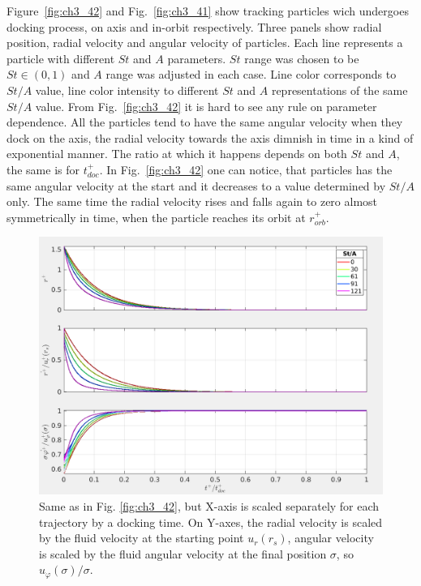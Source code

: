 \documentclass[../main.tex]{subfiles}
\begin{document}
Figure~\ref{fig:ch3_42} and Fig.~\ref{fig:ch3_41} show tracking particles wich undergoes docking process, on axis and in-orbit respectively. Three panels show radial position, radial velocity and angular velocity of particles. Each line represents a particle with different $St$ and $A$ parameters. $St$ range was chosen to be $St \in (0,1)$ and $A$ range was adjusted in each case. Line color corresponds to $St/A$ value, line color intensity to different $St$ and $A$ representations of the same $St/A$ value. From Fig.~\ref{fig:ch3_42} it is hard to see any rule on parameter dependence. All the particles tend to have the same angular velocity when they dock on the axis, the radial velocity towards the axis dimnish in time in a kind of exponential manner. The ratio at which it happens depends on both $St$ and $A$, the same is for $t^+_{doc}$. In Fig.~\ref{fig:ch3_42} one can notice, that particles has the same angular velocity at the start and it decreases to a value determined by $St/A$ only. The same time the radial velocity rises and falls again to zero almost symmetrically in time, when the particle reaches its orbit at $r^+_{orb}$. 

\begin{figure}
\centering
\noindent \includegraphics[width=30pc]{gfx/point_docking_vel_traj_in_time_scal.png}
\caption{Same as in Fig. \ref{fig:ch3_42}, but X-axis is scaled separately for each trajectory by a docking time. On Y-axes, the radial velocity is scaled by the fluid velocity at the starting point $u_r(r_s)$, angular velocity is scaled by the fluid angular velocity at the final position $\sigma$, so $u_{\varphi}(\sigma)/\sigma$.}
\label{fig:ch3_44}
\end{figure}
\end{document}

